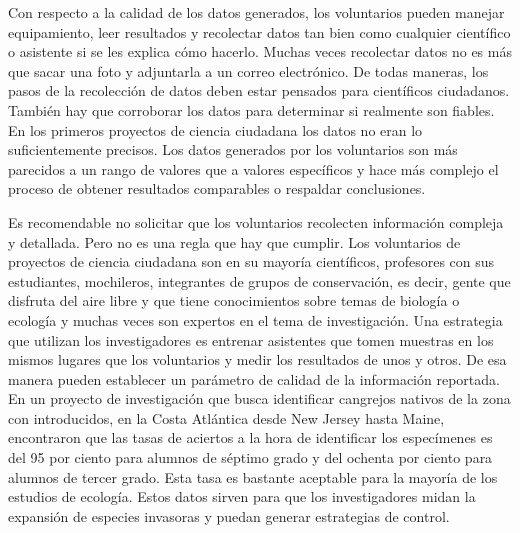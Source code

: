 Con respecto a la calidad de los datos generados, los voluntarios pueden manejar equipamiento, leer resultados y recolectar datos tan bien como cualquier científico o asistente si se les explica cómo hacerlo. Muchas veces recolectar datos no es más que sacar una foto y adjuntarla a un correo electrónico. De todas maneras, los pasos de la recolección de datos deben estar pensados para científicos ciudadanos. También hay que corroborar los datos para determinar si realmente son fiables. En los primeros proyectos de ciencia ciudadana los datos no eran lo suficientemente precisos. Los datos generados por los voluntarios son más parecidos a un rango de valores que a valores específicos y hace más complejo el proceso de obtener resultados comparables o respaldar conclusiones. 

Es recomendable no solicitar que los voluntarios recolecten información compleja y detallada. Pero no es una regla que hay que cumplir. Los voluntarios de proyectos de ciencia ciudadana son en su mayoría científicos, profesores con sus estudiantes, mochileros, integrantes de grupos de conservación, es decir, gente que disfruta del aire libre y que tiene conocimientos sobre temas de biología o ecología y muchas veces son expertos en el tema de investigación. Una estrategia que utilizan los investigadores es entrenar asistentes que tomen muestras en los mismos lugares que los voluntarios y medir los resultados de unos y otros. De esa manera pueden establecer un parámetro de calidad de la información reportada. En un proyecto de investigación que busca identificar cangrejos nativos de la zona con introducidos, en la Costa Atlántica desde New Jersey hasta Maine, encontraron que las tasas de aciertos a la hora de identificar los especímenes es del 95 por ciento para alumnos de séptimo grado y del ochenta por ciento para alumnos de tercer grado. Esta tasa es bastante aceptable para la mayoría de los estudios de ecología. Estos datos sirven para que los investigadores midan la expansión de especies invasoras y puedan generar estrategias de control. \cite{cohn2008citizen}


